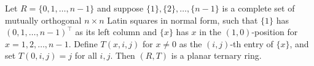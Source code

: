 Let $R = \{0, 1, \dots, n-1\}$ and suppose $\{1\}, \{2\}, \dots, \{n-1\}$ is a complete set of mutually orthogonal $n \times n$ Latin squares in normal form, such that $\{1\}$ has $(0, 1, \dots, n-1)^\top$ as its left column and $\{x\}$ has $x$ in the $(1,0)$-position for $x = 1, 2, \dots, n-1$. Define $T(x, i, j)$ for $x \neq 0$ as the $(i, j)$-th entry of $\{x\}$, and set $T(0, i, j) = j$ for all $i, j$. Then $(R, T)$ is a planar ternary ring.
